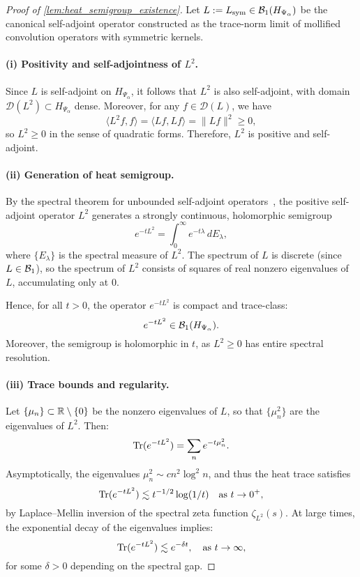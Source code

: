 \begin{proof}[Proof of \cref{lem:heat_semigroup_existence}]
Let \( L := L_{\mathrm{sym}} \in \mathcal{B}_1(H_{\Psi_\alpha}) \) be the canonical self-adjoint operator constructed as the trace-norm limit of mollified convolution operators with symmetric kernels.

\paragraph{(i) Positivity and self-adjointness of \( L^2 \).}
Since \( L \) is self-adjoint on \( H_{\Psi_\alpha} \), it follows that \( L^2 \) is also self-adjoint, with domain \( \mathcal{D}(L^2) \subset H_{\Psi_\alpha} \) dense. Moreover, for any \( f \in \mathcal{D}(L) \), we have
\[
\langle L^2 f, f \rangle = \langle Lf, Lf \rangle = \| Lf \|^2 \ge 0,
\]
so \( L^2 \ge 0 \) in the sense of quadratic forms. Therefore, \( L^2 \) is positive and self-adjoint.

\paragraph{(ii) Generation of heat semigroup.}
By the spectral theorem for unbounded self-adjoint operators~\cite[Ch.~VIII]{ReedSimon1975II}, the positive self-adjoint operator \( L^2 \) generates a strongly continuous, holomorphic semigroup
\[
e^{-t L^2} = \int_0^\infty e^{-t\lambda} \, dE_\lambda,
\]
where \( \{E_\lambda\} \) is the spectral measure of \( L^2 \). The spectrum of \( L \) is discrete (since \( L \in \mathcal{B}_1 \)), so the spectrum of \( L^2 \) consists of squares of real nonzero eigenvalues of \( L \), accumulating only at 0.

Hence, for all \( t > 0 \), the operator \( e^{-t L^2} \) is compact and trace-class:
\[
e^{-t L^2} \in \mathcal{B}_1(H_{\Psi_\alpha}).
\]
Moreover, the semigroup is holomorphic in \( t \), as \( L^2 \ge 0 \) has entire spectral resolution.

\paragraph{(iii) Trace bounds and regularity.}
Let \( \{ \mu_n \} \subset \mathbb{R} \setminus \{0\} \) be the nonzero eigenvalues of \( L \), so that \( \{ \mu_n^2 \} \) are the eigenvalues of \( L^2 \). Then:
\[
\operatorname{Tr}(e^{-t L^2}) = \sum_n e^{-t \mu_n^2}.
\]
Asymptotically, the eigenvalues \( \mu_n^2 \sim c n^2 \log^2 n \), and thus the heat trace satisfies
\[
\operatorname{Tr}(e^{-t L^2}) \lesssim t^{-1/2} \log(1/t) \quad \text{as } t \to 0^+,
\]
by Laplace–Mellin inversion of the spectral zeta function \( \zeta_{L^2}(s) \). At large times, the exponential decay of the eigenvalues implies:
\[
\operatorname{Tr}(e^{-t L^2}) \lesssim e^{-\delta t}, \quad \text{as } t \to \infty,
\]
for some \( \delta > 0 \) depending on the spectral gap.


\end{proof}
